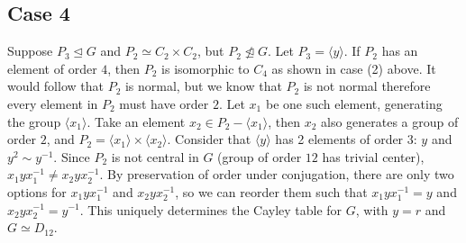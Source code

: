 \subsection*{Case 4} Suppose $P_3 \trianglelefteq G$ and 
$P_2 \simeq C_2 \times C_2$, but $P_2 \not\trianglelefteq G$.
Let $P_3 = \langle y \rangle$.
If $P_2$ has an element of order $4$, then $P_2$ is isomorphic to
$C_4$ as shown in case (2) above. It would follow that $P_2$ is normal,
but we know that $P_2$ is not normal therefore every element in $P_2$
must have order $2$.
Let $x_1$ be one such element, generating the group $\langle x_1 \rangle$.
Take an element $x_2 \in P_2 - \langle x_1 \rangle$,
then $x_2$ also generates a group of order $2$,
and $P_2 = \langle x_1 \rangle \times \langle x_2 \rangle$.
Consider that $\langle y \rangle$ has 2 elements of order $3$:
$y$ and $y^2 \sim y^{-1}$.
Since $P_2$ is not central in $G$ (group of order $12$ has trivial center),
$x_1 yx_1^{-1} \neq x_2 yx_2^{-1}$. By preservation of order under conjugation,
there are only two options for $x_1 yx_1^{-1}$ and $x_2 yx_2^{-1}$,
so we can reorder them such that $x_1 y x_1 ^{-1} = y$ and $x_2 y x_2^{-1} = y^{-1}$.
This uniquely determines the Cayley table for $G$,
with $y = r$ and $G \simeq D_{12}$.
